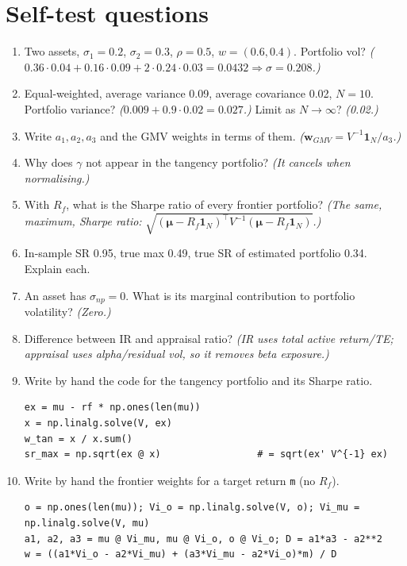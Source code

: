\documentclass[11pt,a4paper]{report}
\newcommand{\one}{\mathbf{1}_N}
\newcommand{\w}{\bm{w}}
\newcommand{\T}{^{\top}}
\newcommand{\mub}{\bm{\mu}}
\begin{document}
\section{Self-test questions}
\begin{enumerate}
  \item Two assets, $\sigma_1=0.2$, $\sigma_2=0.3$, $\rho=0.5$, $w=(0.6,0.4)$. Portfolio vol?
    \emph{($0.36\cdot0.04+0.16\cdot0.09+2\cdot0.24\cdot0.03=0.0432\Rightarrow\sigma=0.208$.)}
  \item Equal-weighted, average variance 0.09, average covariance 0.02, $N=10$.
    Portfolio variance? \emph{($0.009+0.9\cdot0.02=0.027$.)} Limit as $N\to\infty$? \emph{(0.02.)}
  \item Write $a_1,a_2,a_3$ and the GMV weights in terms of them. \emph{($\w_{GMV}=V^{-1}\one/a_3$.)}
  \item Why does $\gamma$ not appear in the tangency portfolio? \emph{(It cancels when normalising.)}
  \item With $R_f$, what is the Sharpe ratio of every frontier portfolio?
    \emph{(The same, maximum, Sharpe ratio:} $\sqrt{(\mub-R_f\one)\T V^{-1}(\mub-R_f\one)}$\emph{.)}
  \item In-sample SR 0.95, true max 0.49, true SR of estimated portfolio 0.34. Explain each.
  \item An asset has $\sigma_{np}=0$. What is its marginal contribution to portfolio volatility? \emph{(Zero.)}
  \item Difference between IR and appraisal ratio? \emph{(IR uses total active
    return/TE; appraisal uses alpha/residual vol, so it removes beta exposure.)}
  \item Write by hand the code for the tangency portfolio and its Sharpe ratio.
\begin{lstlisting}
ex = mu - rf * np.ones(len(mu))
x = np.linalg.solve(V, ex)
w_tan = x / x.sum()
sr_max = np.sqrt(ex @ x)                 # = sqrt(ex' V^{-1} ex)
\end{lstlisting}
  \item Write by hand the frontier weights for a target return \texttt{m} (no $R_f$).
\begin{lstlisting}
o = np.ones(len(mu)); Vi_o = np.linalg.solve(V, o); Vi_mu = np.linalg.solve(V, mu)
a1, a2, a3 = mu @ Vi_mu, mu @ Vi_o, o @ Vi_o; D = a1*a3 - a2**2
w = ((a1*Vi_o - a2*Vi_mu) + (a3*Vi_mu - a2*Vi_o)*m) / D
\end{lstlisting}
\end{enumerate}
\end{document}
